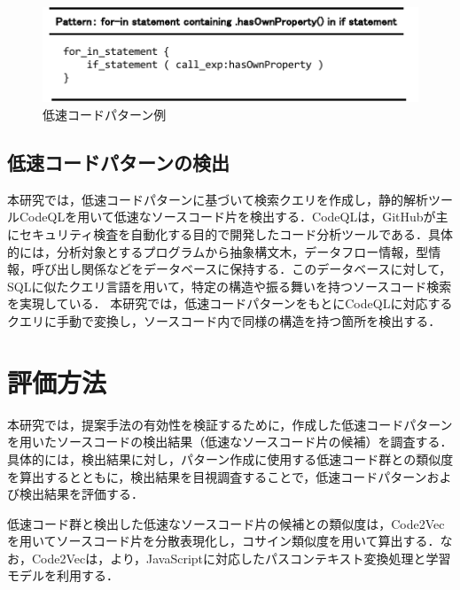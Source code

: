 \documentclass[submit,techrep,noauthor]{ipsj}
\newcommand{\todo}[1]{\colorbox{yellow}{{\bf TODO}:}{\color{red} {\textbf{[#1]}}}}
\begin{document}
\begin{figure}[!h]
    \centering
    \includegraphics[width=1.0\linewidth]{./Noguchi_fig/slow_pattern.pdf}
    \caption{低速コードパターン例}
    \label{fig:slow_pattern}
\end{figure}



\subsection{低速コードパターンの検出}

本研究では，低速コードパターンに基づいて検索クエリを作成し，静的解析ツールCodeQL\cite{ql}を用いて低速なソースコード片を検出する．CodeQLは，GitHubが主にセキュリティ検査を自動化する目的で開発したコード分析ツールである．具体的には，分析対象とするプログラムから抽象構文木，データフロー情報，型情報，呼び出し関係などをデータベースに保持する．このデータベースに対して，SQLに似たクエリ言語を用いて，特定の構造や振る舞いを持つソースコード検索を実現している．
本研究では，低速コードパターンをもとにCodeQLに対応するクエリに手動で変換し，ソースコード内で同様の構造を持つ箇所を検出する．


\section{評価方法}
\label{sec:evaluation}

本研究では，提案手法の有効性を検証するために，作成した低速コードパターンを用いたソースコードの検出結果（低速なソースコード片の候補）を調査する．具体的には，検出結果に対し，パターン作成に使用する低速コード群との類似度を算出するとともに，検出結果を目視調査することで，低速コードパターンおよび検出結果を評価する．

低速コード群と検出した低速なソースコード片の候補との類似度は，Code2Vec\cite{code2vec}を用いてソースコード片を分散表現化し，コサイン類似度を用いて算出する．なお，Code2Vecは，\cite{saiki}より，JavaScriptに対応したパスコンテキスト変換処理と学習モデルを利用する．

\end{document}
